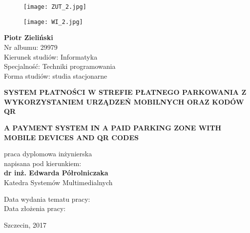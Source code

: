 \begin{titlepage}
	\begin{figure}[!htb]
		\begin{minipage}{0.48\textwidth}
			\raggedright
			\texttt{[image: ZUT\_2.jpg]}
		\end{minipage}\hfill
		\begin{minipage}{0.48\textwidth}
			\raggedleft
			\texttt{[image: WI\_2.jpg]}
		\end{minipage}
	\end{figure}
	\vspace{2.5cm}
	\begin{onehalfspacing}
	\begin{center}
		\textbf{{\large Piotr Zieliński}}\\
		Nr albumu: 29979\\
		Kierunek studiów: Informatyka\\
		Specjalność: Techniki programowania\\
		Forma studiów: studia stacjonarne
	\end{center}
	\vspace{1.5cm}
	\begin{center}
		\textbf{\large SYSTEM PŁATNOŚCI W STREFIE PŁATNEGO PARKOWANIA Z WYKORZYSTANIEM URZĄDZEŃ MOBILNYCH ORAZ KODÓW QR}
	\end{center}
	\begin{center}
		\textbf{\large A PAYMENT SYSTEM IN A PAID PARKING ZONE WITH MOBILE DEVICES AND QR CODES}
	\end{center}
	\begin{center}
		praca dyplomowa inżynierska\\
		napisana pod kierunkiem:\\
		\textbf{{\large dr inż. Edwarda Półrolniczaka}}\\
		Katedra Systemów Multimedialnych
	\end{center}
	\vspace{1.5cm}
	{\footnotesize Data wydania tematu pracy:}\\
	{\footnotesize Data złożenia pracy:}
	
	\vspace{.5cm}
	
	\end{onehalfspacing}
	
	\begin{center}
		Szczecin, 2017
	\end{center}

\end{titlepage}